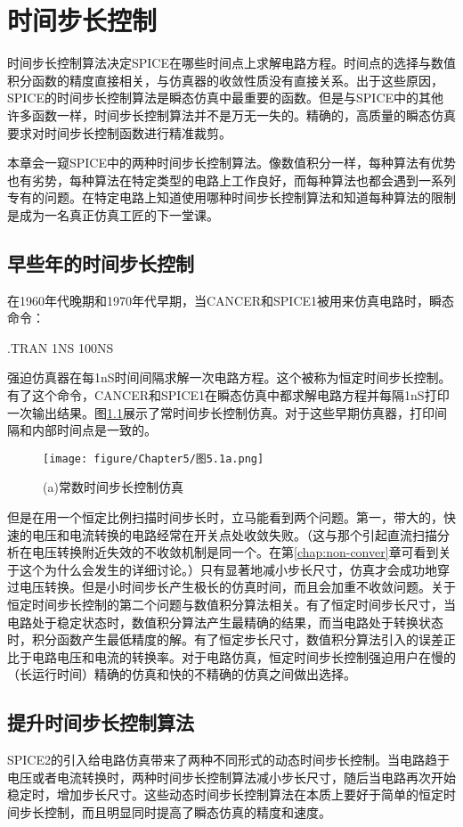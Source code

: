 \chapter{时间步长控制}
\label{chap:5}

时间步长控制算法决定SPICE在哪些时间点上求解电路方程。时间点的选择与数值积分函数的精度直接相关，与仿真器的收敛性质没有直接关系。出于这些原因，SPICE的时间步长控制算法是瞬态仿真中最重要的函数。但是与SPICE中的其他许多函数一样，时间步长控制算法并不是万无一失的。精确的，高质量的瞬态仿真要求对时间步长控制函数进行精准裁剪。

本章会一窥SPICE中的两种时间步长控制算法。像数值积分一样，每种算法有优势也有劣势，每种算法在特定类型的电路上工作良好，而每种算法也都会遇到一系列专有的问题。在特定电路上知道使用哪种时间步长控制算法和知道每种算法的限制是成为一名真正仿真工匠的下一堂课。

\section{早些年的时间步长控制}
在1960年代晚期和1970年代早期，当CANCER和SPICE1被用来仿真电路时，瞬态命令：

.TRAN 1NS 100NS

强迫仿真器在每1nS时间间隔求解一次电路方程。这个被称为恒定时间步长控制。有了这个命令，CANCER和SPICE1在瞬态仿真中都求解电路方程并每隔1nS打印一次输出结果。图\ref{图5.1a}展示了常时间步长控制仿真。对于这些早期仿真器，打印间隔和内部时间点是一致的。

\begin{figure}[htbp]
\small
    \centering
    \texttt{[image: figure/Chapter5/图5.1a.png]}
    \caption{(a)常数时间步长控制仿真}
    \label{图5.1a}
\end{figure}

但是在用一个恒定比例扫描时间步长时，立马能看到两个问题。第一，带大的，快速的电压和电流转换的电路经常在开关点处收敛失败。（这与那个引起直流扫描分析在电压转换附近失效的不收敛机制是同一个。在第\ref{chap:non-conver}章可看到关于这个为什么会发生的详细讨论。）只有显著地减小步长尺寸，仿真才会成功地穿过电压转换。但是小时间步长产生极长的仿真时间，而且会加重不收敛问题。关于恒定时间步长控制的第二个问题与数值积分算法相关。有了恒定时间步长尺寸，当电路处于稳定状态时，数值积分算法产生最精确的结果，而当电路处于转换状态时，积分函数产生最低精度的解。有了恒定步长尺寸，数值积分算法引入的误差正比于电路电压和电流的转换率。对于电路仿真，恒定时间步长控制强迫用户在慢的（长运行时间）精确的仿真和快的不精确的仿真之间做出选择。

\section{提升时间步长控制算法}
SPICE2的引入给电路仿真带来了两种不同形式的动态时间步长控制。当电路趋于电压或者电流转换时，两种时间步长控制算法减小步长尺寸，随后当电路再次开始稳定时，增加步长尺寸。这些动态时间步长控制算法在本质上要好于简单的恒定时间步长控制，而且明显同时提高了瞬态仿真的精度和速度。


